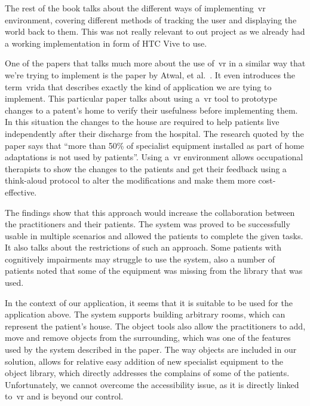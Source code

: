     The rest of the book talks about the different ways of implementing~\acrshort{vr} environment, covering different methods of tracking the user and displaying the world back to them. This was not really relevant to out project as we already had a working implementation in form of HTC Vive to use.
    
    One of the papers that talks much more about the use of~\acrshort{vr} in a similar way that we're trying to implement is the paper by Atwal, et al.~\cite{atwal2014}. It even introduces the term~\acrfull{vrida} that describes exactly the kind of application we are tying to implement. This particular paper talks about using a~\acrshort{vr} tool to prototype changes to a patent's home to verify their usefulness before implementing them. In this situation the changes to the house are required to help patients live independently after their discharge from the hospital. The research quoted by the paper says that ``more than 50\% of specialist equipment installed as part of home adaptations is not used by patients''. Using a~\acrshort{vr} environment allows occupational therapists to show the changes to the patients and get their feedback using a think-aloud protocol to alter the modifications and make them more cost-effective.
    
    The findings show that this approach would increase the collaboration between the practitioners and their patients. The system was proved to be successfully usable in multiple scenarios and allowed the patients to complete the given tasks. It also talks about the restrictions of such an approach. Some patients with cognitively impairments may struggle to use the system, also a number of patients noted that some of the equipment was missing from the library that was used.
    
    In the context of our application, it seems that it is suitable to be used for the application above. The system supports building arbitrary rooms, which can represent the patient's house. The object tools also allow the practitioners to add, move and remove objects from the surrounding, which was one of the features used by the system described in the paper. The way objects are included in our solution, allows for relative easy addition of new specialist equipment to the object library, which directly addresses the complains of some of the patients. Unfortunately, we cannot overcome the accessibility issue, as it is directly linked to~\acrshort{vr} and is beyond our control.
    

